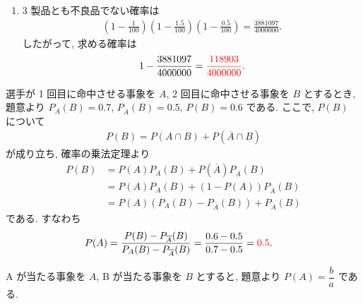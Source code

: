 \begin{qenumerate}
{\begin{enumerate}
{\begin{align}
			\end{align}
			B, C のみ不良品であり, A は不良品でない確率は
			\begin{align}
				\frac{1.5}{100}\cdot\frac{0.5}{100}\cdot\left(1 - \frac{1}{100}\right) = \frac{74.25}{1000000}, 
			\end{align}
			C, A のみ不良品であり, B は不良品でない確率は
			\begin{align}
				\frac{0.5}{100}\cdot\frac{1}{100}\cdot\left(1 - \frac{1.5}{100}\right) = \frac{49.25}{1000000}.
			\end{align}
			以上より, 求める確率は
			\begin{align}
				\frac{149.25}{1000000} + \frac{74.25}{1000000} + \frac{49.25}{1000000} = \red{\frac{1091}{4000000}}.
			\end{align}
		}
		\item{
			3 製品とも不良品でない確率は
			\begin{align}
				\left(1 - \frac{1}{100}\right)\left(1 - \frac{1.5}{100}\right)\left(1 - \frac{0.5}{100}\right) = \frac{3881097}{4000000}.
			\end{align}
			したがって, 求める確率は
			\begin{align}
				1 - \frac{3881097}{4000000} = \textcolor{red}{\frac{118903}{4000000}}.
			\end{align}
		}
		\end{enumerate}
	}
	\item{
		選手が 1 回目に命中させる事象を $A$, 2 回目に命中させる事象を $B$ とするとき, 題意より $P_{A}(B) = 0.7$, $P_{\overline{A}}(B) = 0.5$, $P(B) = 0.6$ である.
		ここで, $P(B)$ について
		\begin{align}
			P(B) = P(A\cap B) + P\left(\overline{A}\cap B\right)
		\end{align}
		が成り立ち, 確率の乗法定理より
		\begin{align}
			P(B) &= P(A)P_{A}(B) + P\left(\overline{A}\right)P_{\overline{A}}(B) \\
				&= P(A)P_{A}(B) + (1 - P(A))P_{\overline{A}}(B) \\
				&= P(A)\left(P_{A}(B) - P_{\overline{A}}(B)\right) + P_{\overline{A}}(B)
		\end{align}
		である.
		すなわち
		\begin{align}
			P(A) &= \frac{P(B) - P_{\overline{A}}(B)}{P_{A}(B) - P_{\overline{A}}(B)} = \frac{0.6 - 0.5}{0.7 - 0.5} = \textcolor{red}{0.5}.
		\end{align}
	}
	\item{
		A が当たる事象を $A$, B が当たる事象を $B$ とすると, 題意より $P(A) = \dfrac{b}{a}$ である.
}
\end{qenumerate}
